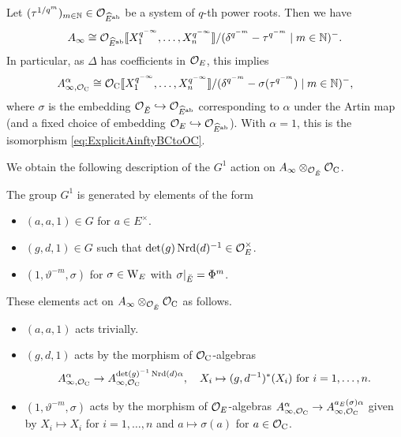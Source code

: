 \documentclass[../main.tex]{subfiles}
\begin{document}
\begin{cor}\label{cor:StructureOfAinfty}
  Let $(\tau^{1/q^m})_{m \in \mathbb{N}} \in \mathcal{O}_{\widehat E^{\mathrm{ab}}}$ be a  system of $q$-th power roots. Then we have 
  \begin{equation*}
    A_\infty \cong \mathcal{O}_{\widehat E^{\mathrm{ab}}}\llbracket X_1^{q^{-\infty}}, \dots,
    X_n^{q^{-\infty}}\rrbracket/(\delta^{q^{-m}} - \tau^{q^{-m}} \mid m \in \mathbb{N})^-.
  \end{equation*}
  In particular, 
  as $\Delta$ has coefficients in $\mathcal{O}_E$, this implies
  \begin{equation*}
    A_{\infty, \mathcal{O}_{\mathrm{C}}}^\alpha \cong \mathcal{O}_{{\mathrm{C}}}\llbracket X_1^{q^{-\infty}}, \dots,
    X_n^{q^{-\infty}}\rrbracket/(\delta^{q^{-m}} - \sigma(\tau^{q^{-m}}) \mid m \in \mathbb{N})^-,
  \end{equation*}
  where $\sigma$ is the embedding $\mathcal{O}_{\breve {E}} \hookrightarrow \mathcal{O}_{\widehat E^{\mathrm{ab}}}$ corresponding
  to $\alpha$ under the Artin map (and a fixed choice of embedding
  $\mathcal{O}_E \hookrightarrow \mathcal{O}_{\widehat E^{\mathrm{ab}}}$). With $\alpha = 1$, this is the isomorphism
  \eqref{eq:ExplicitAinftyBCtoOC}.
\end{cor}

We obtain the following description of the $G^1$ action on $A_{\infty}\otimes_{\mathcal{O}_{\breve {E}}}
\mathcal{O}_{\mathrm{C}}$.
\begin{prop}\label{prop:ExplicitDescriptionOfActionOnAinfty}
  The group $G^1$ is generated by elements of the form
  \begin{itemize}
    \item $(a, a, 1) \in G$ for $a \in E^\times$.
    \item $(g, d, 1) \in G$ such that $\det(g) \operatorname{Nrd}(d)^{-1} \in \mathcal{O}_E^\times$.
    \item $(1, \vartheta^{-m}, \sigma)$ for $\sigma \in \mathrm W_E$ with
      $\sigma|_{{\breve {E}}} = \Phi^m$. 
  \end{itemize}
  These elements act on $A_{\infty} \otimes_{\mathcal{O}_{\breve {E}}} \mathcal{O}_{\mathrm{C}}$ as follows.
  \begin{itemize}
    \item $(a,a,1)$ acts trivially.
    \item $(g,d,1)$ acts by the morphism of $\mathcal{O}_{\mathrm{C}}$-algebras
      $$A_{\infty, \mathcal{O}_{\mathrm{C}}}^\alpha \to A_{\infty, \mathcal{O}_{\mathrm{C}}}^{\det(g)^{-1} \operatorname{Nrd}(d) \alpha},
    \quad X_i \mapsto (g,d^{-1})^*(X_i) \ \text{for} \ i = 1, \dots,n.$$
    \item $(1, \vartheta^{-m}, \sigma)$ acts by the morphism of $\mathcal{O}_E$-algebras 
      $A_{\infty, \mathcal{O}_{\mathrm{C}}}^\alpha \to A_{\infty, \mathcal{O}_{\mathrm{C}}}^{a_E(\sigma)\alpha}$
      given by $X_i \mapsto X_i$ for $i = 1, \dots, n$ and $a \mapsto
      \sigma(a)$ for $a \in \mathcal{O}_{\mathrm{C}}$.
  \end{itemize}
\end{prop}
\end{document}
